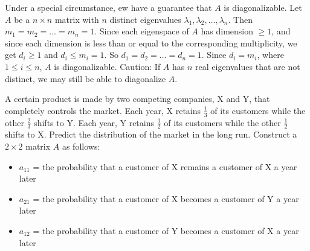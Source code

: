 \documentclass[12pt]{article}
\begin{document}
Under a special circumstance, ew have a guarantee that $A$ is diagonalizable. Let $A$ be a $n \times n$ matrix with $n$ distinct eigenvalues $\lambda_ 1, \lambda_2, \dots, \lambda_n$. Then $m_1 = m_2 = \dots = m_n = 1$. Since each eigenspace of $A$ has dimension $\geq 1$, and since each dimension is less than or equal to the corresponding multiplicity, we get $d_i \geq 1$ and $d_i \leq m_i = 1$. So $d_1 = d_2 = \dots = d_n = 1$. Since $d_i = m_i$, where $1 \leq i \leq n$, $A$ is diagonalizable. \newline Caution: If $A$ has $n$ real eigenvalues that are not distinct, we may still be able to diagonalize $A$. 
\begin{example} A certain product is made by two competing companies, X and Y, that completely controls the market. Each year, X retains $\frac{1}{3}$ of its customers while the other $\frac{2}{3}$ shifts to Y. Each year, Y retains $\frac{1}{2}$ of its customers while the other $\frac{1}{2}$ shifts to X. Predict the distribution of the market in the long run. \newline 
Construct a $2 \times 2$ matrix $A$ as follows: \begin{itemize} \item $a_{11}$ = the probability that a customer of X remains a customer of X a year later 
\item $a_{21}$ = the probability that a customer of X becomes a customer of Y a year later
\item $a_{12}$ = the probability that a customer of Y becomes a customer of X a year later 

\end{itemize}
\end{example}
\end{document}
